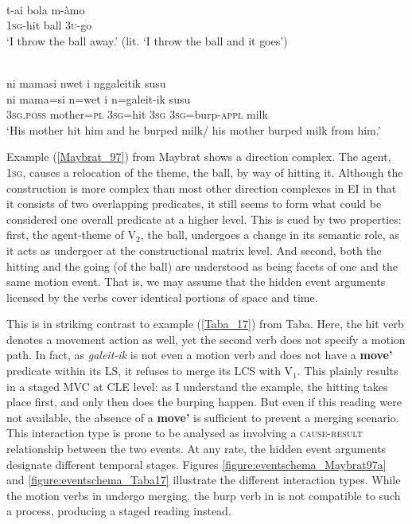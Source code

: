 \ea \label{Maybrat_97} 
\\
\gll t-ai bola m-àmo \\
1\textsc{sg}-hit ball 3\textsc{u}-go \\
\glft `I throw the ball away.' (lit. `I throw the ball and it goes') \\ 
\z

\ea \label{Taba_17}
\\
\glll ni mamasi nwet i nggaleitik susu \\
ni mama=si n=wet i n=galeit-ik susu \\
3\textsc{sg}.\textsc{poss} mother=\textsc{pl} 3\textsc{sg}=hit 3\textsc{sg} 3\textsc{sg}=burp-\textsc{appl} milk\\
\glft `His mother hit him and he burped milk/ his mother burped milk from him.'\\ 
\z

Example (\ref{Maybrat_97}) from Maybrat shows a direction complex. The agent, 1\textsc{sg}, causes a relocation of the theme, the ball, by way of hitting it. Although the construction is more complex than most other direction complexes in EI in that it consists of two overlapping predicates, it still seems to form what could be considered one overall predicate at a higher level. This is cued by two properties: first, the agent-theme of V$_2$, the ball, undergoes a change in its semantic role, as it acts as undergoer at the constructional matrix level. And second, both the hitting and the going (of the ball) are understood as being facets of one and the same motion event. That is, we may assume that the hidden event arguments licensed by the verbs cover identical portions of space and time. 

This is in striking contrast to example (\ref{Taba_17}) from Taba. Here, the hit verb denotes a movement action as well, yet the second verb does not specify a motion path. In fact, as \textit{galeit-ik} is not even a motion verb and does not have a \textbf{move'} predicate within its LS, it refuses to merge its LCS with V$_1$. This plainly results in a staged MVC at CLE level: as I understand the example, the hitting takes place first, and only then does the burping happen. But even if this reading were not available, the absence of a \textbf{move'} is sufficient to prevent a merging scenario. This interaction type is prone to be analysed as involving a \textsc{cause-result} relationship between the two events. At any rate, the hidden event arguments designate different temporal stages. Figures \ref{figure:eventschema_Maybrat97a} and \ref{figure:eventschema_Taba17} illustrate the different interaction types. While the motion verbs in  undergo merging, the burp verb in  is not compatible to such a process, producing a staged reading instead.

